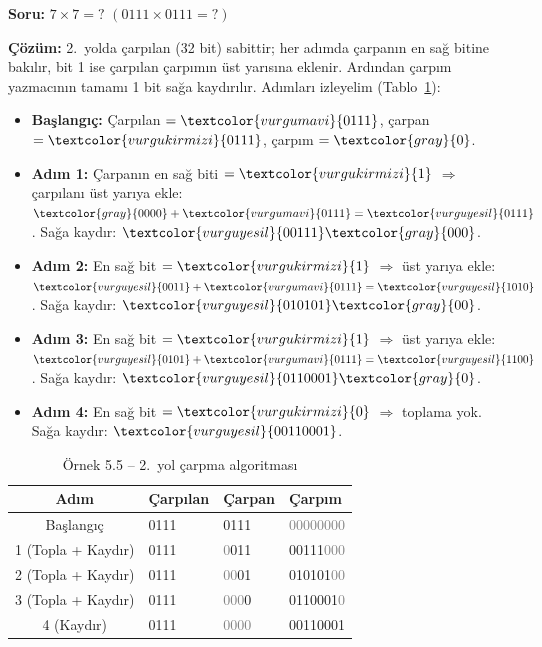 \begin{ornek}[5.5]
\textbf{Soru:} $7 \times 7 = ?$ \quad $(0111 \times 0111 = ?)$

\textbf{Çözüm:} 2.\ yolda çarpılan (32 bit) sabittir; her adımda çarpanın en sağ bitine bakılır, bit 1 ise çarpılan çarpımın üst yarısına eklenir. Ardından çarpım yazmacının tamamı 1 bit sağa kaydırılır. Adımları izleyelim (Tablo~\ref{tab:carpma2-ornek}):

\begin{itemize}[nosep]
\item \textbf{Başlangıç:} Çarpılan $= \textcolor{vurgumavi}{0111}$, çarpan $= \textcolor{vurgukirmizi}{0111}$, çarpım $= \textcolor{gray}{0}$.
\item \textbf{Adım 1:} Çarpanın en sağ biti $= \textcolor{vurgukirmizi}{1}$ $\Rightarrow$ çarpılanı üst yarıya ekle: $\textcolor{gray}{0000} + \textcolor{vurgumavi}{0111} = \textcolor{vurguyesil}{0111}$. Sağa kaydır: $\textcolor{vurguyesil}{00111}\textcolor{gray}{000}$.
\item \textbf{Adım 2:} En sağ bit $= \textcolor{vurgukirmizi}{1}$ $\Rightarrow$ üst yarıya ekle: $\textcolor{vurguyesil}{0011} + \textcolor{vurgumavi}{0111} = \textcolor{vurguyesil}{1010}$. Sağa kaydır: $\textcolor{vurguyesil}{010101}\textcolor{gray}{00}$.
\item \textbf{Adım 3:} En sağ bit $= \textcolor{vurgukirmizi}{1}$ $\Rightarrow$ üst yarıya ekle: $\textcolor{vurguyesil}{0101} + \textcolor{vurgumavi}{0111} = \textcolor{vurguyesil}{1100}$. Sağa kaydır: $\textcolor{vurguyesil}{0110001}\textcolor{gray}{0}$.
\item \textbf{Adım 4:} En sağ bit $= \textcolor{vurgukirmizi}{0}$ $\Rightarrow$ toplama yok. Sağa kaydır: $\textcolor{vurguyesil}{00110001}$.
\end{itemize}

\begin{table}[H]
\centering
\caption{Örnek 5.5 -- 2.\ yol çarpma algoritması}
\label{tab:carpma2-ornek}
\small
\begin{tabular}{c l l l}
\toprule
\textbf{Adım} & \textbf{\textcolor{vurgumavi}{Çarpılan}} & \textbf{\textcolor{vurgukirmizi}{Çarpan}} & \textbf{\textcolor{vurguyesil}{Çarpım}} \\
\midrule
Başlangıç & \textcolor{vurgumavi}{0111} & \textcolor{vurgukirmizi}{0111} & \textcolor{gray}{00000000} \\
1 (Topla + Kaydır) & \textcolor{vurgumavi}{0111} & \textcolor{gray}{0}\textcolor{vurgukirmizi}{011} & \textcolor{vurguyesil}{00111}\textcolor{gray}{000} \\
2 (Topla + Kaydır) & \textcolor{vurgumavi}{0111} & \textcolor{gray}{00}\textcolor{vurgukirmizi}{01} & \textcolor{vurguyesil}{010101}\textcolor{gray}{00} \\
3 (Topla + Kaydır) & \textcolor{vurgumavi}{0111} & \textcolor{gray}{000}\textcolor{vurgukirmizi}{0} & \textcolor{vurguyesil}{0110001}\textcolor{gray}{0} \\
4 (Kaydır) & \textcolor{vurgumavi}{0111} & \textcolor{gray}{0000} & \textcolor{vurguyesil}{00110001} \\
\bottomrule
\end{tabular}
\end{table}


\end{ornek}
